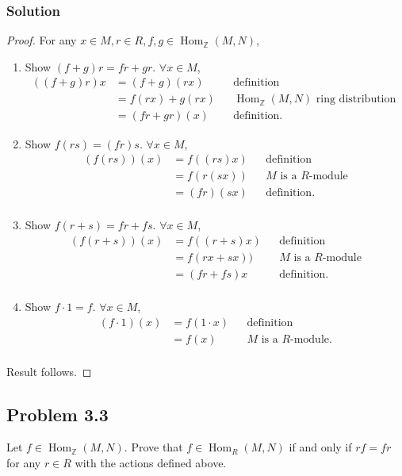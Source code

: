 \documentclass{article}
\theoremstyle{plain}
\newcommand{\Z}{\mathbb{Z}}
\DeclareMathOperator{\Hom}{Hom}
\begin{document}
\subsubsection*{Solution}
\begin{proof}
          For any $x\in M, r\in R, f,g\in\Hom_{\Z}(M,N)$,
  \begin{enumerate}
    \item Show $(f+g)r=fr+gr$. $\forall x\in M$,
          \begin{align*}
            ((f+g)r)x&=(f+g)(rx)&&\text{definition}\\
                     &=f(rx)+g(rx)&&\Hom_{\Z}(M,N)\text{ ring distribution }\\
                     &=(fr+gr)(x) &&\text{definition}.
        \end{align*}
    \item Show $f(rs)=(fr)s$. $\forall x\in M$,
          \begin{align*}
            (f(rs))(x)&=f((rs)x)&&\text{definition}\\
                      &=f(r(sx))&&M\text{ is a }R\text{-module}\\
                      &=(fr)(sx)&&\text{definition}.\\
          \end{align*}
    \item Show $f(r+s)=fr+fs$. $\forall x\in M$,
          \begin{align*}
            (f(r+s))(x)&=f((r+s)x)&&\text{definition}\\
                      &=f(rx+sx))&&M\text{ is a }R\text{-module}\\
                      &=(fr+fs)x&&\text{definition}.\\
          \end{align*}
    \item Show $f\cdot1=f$. $\forall x\in M$,
          \begin{align*}
            (f\cdot1)(x)&=f(1\cdot x)&&\text{definition}\\
                      &=f(x)&&M\text{ is a }R\text{-module}.\\
          \end{align*}
\end{enumerate}
Result follows.
\end{proof}
\subsection*{Problem 3.3}
Let $f\in\Hom_{\Z}(M,N)$. Prove that $f\in\Hom_{R}(M,N)$ if and only if $rf=fr$ for
any $r\in R$ with the actions defined above.
\end{document}
